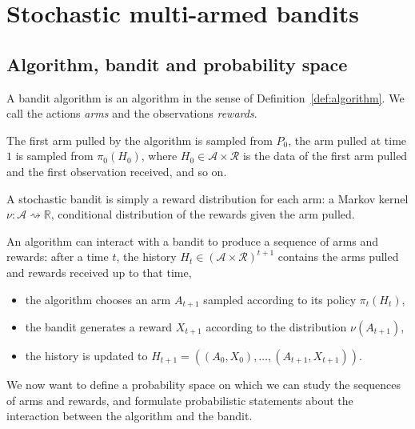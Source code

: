\chapter{Stochastic multi-armed bandits}

\section{Algorithm, bandit and probability space}

A bandit algorithm is an algorithm in the sense of Definition~\ref{def:algorithm}.
We call the actions \emph{arms} and the observations \emph{rewards}.

The first arm pulled by the algorithm is sampled from $P_0$, the arm pulled at time $1$ is sampled from $\pi_0(H_0)$, where $H_0 \in \mathcal{A} \times \mathcal{R}$ is the data of the first arm pulled and the first observation received, and so on.


\begin{definition}[Bandit]\label{def:bandit}
  \leanok
A stochastic bandit is simply a reward distribution for each arm: a Markov kernel $\nu : \mathcal{A} \rightsquigarrow \mathbb{R}$, conditional distribution of the rewards given the arm pulled.
\end{definition}

An algorithm can interact with a bandit to produce a sequence of arms and rewards: after a time $t$, the history $H_t \in (\mathcal{A} \times \mathcal{R})^{t+1}$ contains the arms pulled and rewards received up to that time,
\begin{itemize}
  \item the algorithm chooses an arm $A_{t+1}$ sampled according to its policy $\pi_t(H_t)$,
  \item the bandit generates a reward $X_{t+1}$ according to the distribution $\nu(A_{t+1})$,
  \item the history is updated to $H_{t+1} = ((A_0, X_0), \ldots, (A_{t+1}, X_{t+1}))$.
\end{itemize}

We now want to define a probability space on which we can study the sequences of arms and rewards, and formulate probabilistic statements about the interaction between the algorithm and the bandit.


